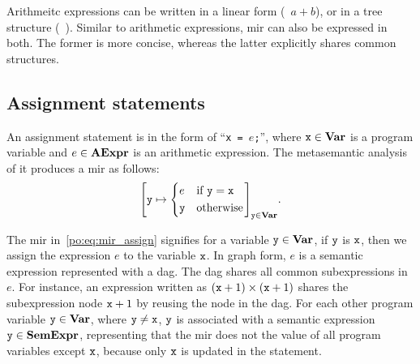 Arithmeitc expressions can be written in a linear form (\eg~$a + b$), or in
a tree structure (\eg~).  Similar to arithmetic
expressions, \gls{mir} can also be expressed in both.  The former is more
concise, whereas the latter explicitly shares common structures.



\subsection{Assignment statements}

An assignment statement is in the form of ``\texttt{x = $e$;}'', where
$\texttt{x} \in \mathbf{Var}$ is a program variable and $e \in \mathbf{AExpr}$ is an
arithmetic expression.  The metasemantic analysis of it produces a \gls{mir}
as follows:
\begin{equation}
    {\left[
        \texttt{y}\mapsto \left\{
            \begin{aligned}
                & e && \text{if~} \texttt{y}= \texttt{x}\\
                & \texttt{y}&& \text{otherwise}
            \end{aligned}
        \right.
    \right]}_{\texttt{y} \in \mathbf{Var}}.
    \label{po:eq:mir_assign}
\end{equation}

The \gls{mir} in~\eqref{po:eq:mir_assign} signifies for a variable $\texttt{y} \in
\mathbf{Var}$, if $\texttt{y}$ is $\texttt{x}$, then we assign the expression $e$ to the
variable $\texttt{x}$.  In graph form, $e$ is a semantic expression represented with
a \gls{dag}\@.  The \gls{dag} shares all common subexpressions in $e$.  For
instance, an expression written as $(\texttt{x} + 1) \times (\texttt{x} + 1)$ shares the
subexpression node $\texttt{x} + 1$ by reusing the node in the \gls{dag}\@.  For
each other program variable $\texttt{y} \in \mathbf{Var}$, where $\texttt{y} \neq \texttt{x}$,
$\texttt{y}$ is associated with a semantic expression $\texttt{y} \in \mathbf{SemExpr}$,
representing that the \gls{mir} does not the value of all program variables
except $\texttt{x}$, because only $\texttt{x}$ is updated in the statement.

